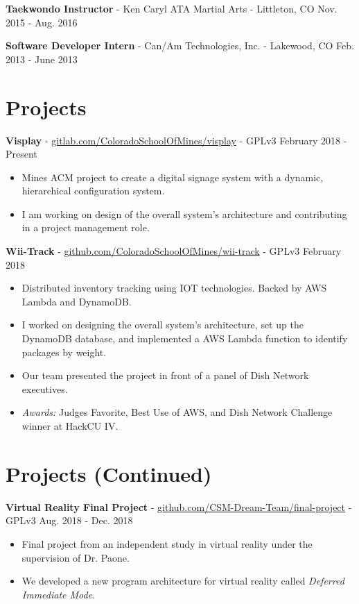 \documentclass[10pt,letterpaper]{article}
\begin{document}
\vspace{2pt}
\textbf{Taekwondo Instructor} - Ken Caryl ATA Martial Arts - Littleton, CO
\hfill Nov. 2015 - Aug. 2016

\vspace{2pt}
\textbf{Software Developer Intern} - Can/Am Technologies, Inc. - Lakewood, CO
\hfill Feb. 2013 - June 2013

\section*{Projects}
\textbf{Visplay} -
\href{https://gitlab.com/ColoradoSchoolOfMines/visplay}{gitlab.com/ColoradoSchoolOfMines/visplay}
- GPLv3 \hfill February 2018 - Present
\begin{itemize}
    \item Mines ACM project to create a digital signage system with a dynamic,
        hierarchical configuration system.
    \item I am working on design of the overall system's architecture and
        contributing in a project management role.
\end{itemize}

\textbf{Wii-Track} -
\href{https://github.com/ColoradoSchoolOfMines/wii-track}{github.com/ColoradoSchoolOfMines/wii-track}
- GPLv3 \hfill February 2018
\begin{itemize}
    \item Distributed inventory tracking using IOT technologies. Backed by AWS
        Lambda and DynamoDB.
    \item I worked on designing the overall system's architecture, set up the
        DynamoDB database, and implemented a AWS Lambda function to identify
        packages by weight.
    \item Our team presented the project in front of a panel of Dish Network
        executives.
    \item \textit{Awards:} Judges Favorite, Best Use of AWS, and Dish Network
        Challenge winner at HackCU IV.
\end{itemize}

\section*{Projects (Continued)}
\textbf{Virtual Reality Final Project} -
\href{https://github.com/CSM-Dream-Team/final-project}{github.com/CSM-Dream-Team/final-project}
- GPLv3 \hfill Aug. 2018 - Dec. 2018
\begin{itemize}
    \item Final project from an independent study in virtual reality under the
        supervision of Dr. Paone.
    \item We developed a new program architecture for virtual reality called
        \textit{Deferred Immediate Mode}.
\end{itemize}
\end{document}
